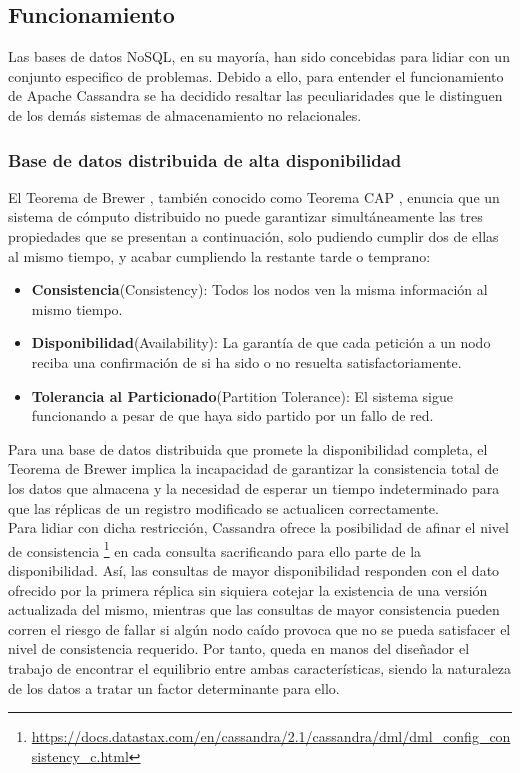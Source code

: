 \subsection{Funcionamiento}

Las bases de datos NoSQL, en su mayoría, han sido concebidas para lidiar con un conjunto especifico de problemas. Debido a ello, para entender el funcionamiento de Apache Cassandra se ha decidido resaltar las peculiaridades que le distinguen de los demás sistemas de almacenamiento no relacionales.

\subsubsection{Base de datos distribuida de alta disponibilidad}

El Teorema de Brewer \cite{gilbert2002brewer}, también conocido como Teorema CAP , enuncia que un sistema de cómputo distribuido no puede  garantizar simultáneamente las tres propiedades que se presentan a continuación, solo pudiendo cumplir dos de ellas al mismo tiempo, y acabar cumpliendo la restante tarde o temprano:

\begin{itemize}
	\item \textbf{Consistencia}(Consistency): Todos los nodos ven la misma información al mismo tiempo.
	\item \textbf{Disponibilidad}(Availability): La garantía de que cada petición a un nodo reciba una confirmación de si ha sido o no resuelta satisfactoriamente.
	\item \textbf{Tolerancia al Particionado}(Partition Tolerance): El sistema sigue funcionando a pesar de que haya sido partido por un fallo de red.
\end{itemize}

Para una base de datos distribuida que promete la disponibilidad completa, el Teorema de Brewer implica la incapacidad de garantizar la consistencia total de los datos que almacena y la necesidad de esperar un tiempo indeterminado para que las réplicas de un registro modificado se actualicen correctamente.\\

Para lidiar con dicha restricción, Cassandra ofrece la posibilidad de afinar el nivel de consistencia \footnote{\url{https://docs.datastax.com/en/cassandra/2.1/cassandra/dml/dml_config_consistency_c.html}} en cada consulta sacrificando para ello parte de la disponibilidad. Así, las consultas de mayor disponibilidad responden con el dato ofrecido por la primera réplica sin siquiera cotejar la existencia de una versión actualizada del mismo, mientras que las consultas de mayor consistencia pueden corren el riesgo de fallar si algún nodo caído provoca que no se pueda satisfacer el nivel de consistencia requerido. Por tanto, queda en manos del diseñador el trabajo de encontrar el equilibrio entre ambas características, siendo la naturaleza de los datos a tratar un factor determinante para ello.

